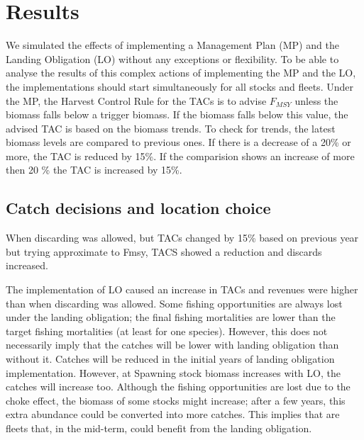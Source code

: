 \documentclass[12pt,oneline,a4paper,numbib]{ouparticle}
\numberwithin{equation}{subsection} %
\begin{document}

\section{Results}

We simulated the effects of implementing a Management Plan (MP) and the Landing Obligation (LO) without any exceptions or flexibility. To be able to analyse the results of this complex actions of implementing the MP and the LO, the implementations should start simultaneously for all stocks and fleets. Under the MP, the Harvest Control Rule for the TACs is to advise $F_{MSY}$ unless the biomass falls below a trigger biomass. If the biomass falls below this value, the advised TAC is based on the biomass trends. To check for trends, the latest biomass levels are compared to previous ones. If there is a decrease of a 20\% or more, the TAC is reduced by 15\%. If the comparision shows an increase of more then 20 \% the TAC is increased by 15\%.

\subsection{Catch decisions and location choice}

When discarding was allowed, but TACs changed by 15\% based on previous year but trying approximate to Fmsy, TACS showed a reduction and discards increased. 

The implementation of LO caused an increase in TACs and revenues were higher than when discarding was allowed. Some fishing opportunities are always lost under the landing obligation; the final fishing mortalities are lower than the target fishing mortalities (at least for one species). However, this does not necessarily imply that the catches will be lower with landing obligation than without it. Catches will be reduced in the initial years of landing obligation implementation. However, at Spawning stock biomass increases with LO, the catches will increase too. Although the fishing opportunities are lost due to the choke effect, the biomass of some stocks might increase; after a few years, this extra abundance could be converted into more catches. This implies that are fleets that, in the mid-term, could benefit from the landing obligation.
\end{document}
